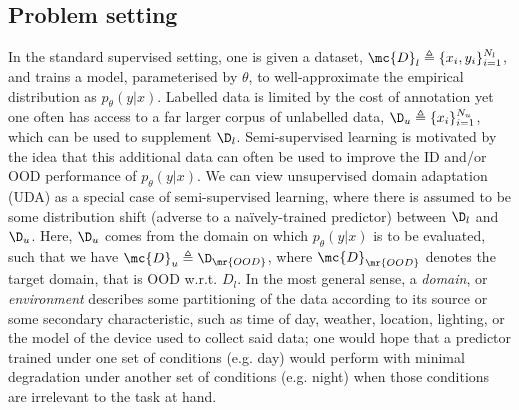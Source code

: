 \subsection{Problem setting}

In the standard supervised setting, one is given a dataset, $\mc{D}_l \triangleq \{x_i,
y_i\}_{i=1}^{N_l}$, and trains a model, parameterised by $\theta$, to well-approximate the
empirical distribution as $p_\theta(y | x)$.
%
Labelled data is limited by the cost of annotation yet one often has access to a far larger corpus
of unlabelled data, $\D_u \triangleq \{x_i\}_{i=1}^{N_u}$, which can be used to supplement $\D_l$. 
%
Semi-supervised learning is motivated by the idea that this additional data can often be used to
improve the ID and/or OOD performance of $p_\theta(y | x)$.
%
We can view unsupervised domain adaptation (UDA) as a special case of semi-supervised learning,
where there is assumed to be some distribution shift (adverse to a na\"ively-trained predictor)
between $\D_l$ and $\D_u$. Here, $\D_u$ comes from the domain on which $p_\theta(y | x)$ is to be
evaluated, such that we have $\mc{D}_u \triangleq \D_\mr{OOD}$, where $\mc{D}_\mr{OOD}$ denotes the
target domain, that is OOD w.r.t. $D_l$.
%
In the most general sense, a \emph{domain}, or \emph{environment} \citep{arjovsky2019invariant,
creager2021environment} describes some partitioning of the data according to its source or some
secondary characteristic, such as time of day, weather, location, lighting, or the model of the
device used to collect said data; one would hope that a predictor trained under one set of
conditions (e.g. day) would perform with minimal degradation under another set of conditions (e.g.
night) when those conditions are irrelevant to the task at hand.
%

